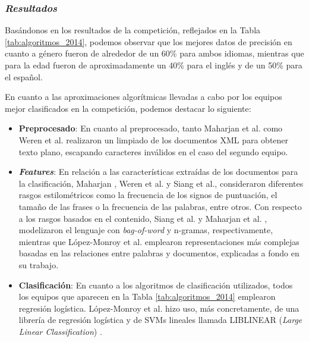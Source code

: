 \subsubsection{\textit{Resultados}}

Basándonos en los resultados de la competición, reflejados en la Tabla \ref{tab:algoritmos_2014}, podemos observar que los mejores datos de precisión
en cuanto a género fueron de alrededor de un 60\% para ambos idiomas, mientras que para la edad fueron de aproximadamente un 40\% para el inglés y de
un 50\% para el español.

\bigskip
En cuanto a las aproximaciones algorítmicas llevadas a cabo por los equipos mejor clasificados en la competición, podemos destacar lo siguiente:

\begin{itemize}
	\item \textbf{Preprocesado}: En cuanto al preprocesado, tanto Maharjan et al. \cite{maharjan2014simple} como Weren et al. \cite{weren2014exploring} realizaron un limpiado de los documentos XML para obtener
	texto plano, escapando caracteres inválidos en el caso del segundo equipo.
	\item \textbf{\textit{Features}}: En relación a las características extraídas de los documentos para la clasificación, Maharjan \cite{maharjan2014simple}, Weren et al. \cite{weren2014exploring} y Siang et al.,
	consideraron diferentes rasgos estilométricos como la frecuencia de los signos de puntuación, el tamaño de las frases o la frecuencia de las palabras, entre otros. Con respecto 
	a los rasgos basados en el contenido, Siang et al. y Maharjan et al. \cite{maharjan2014simple}, modelizaron el lenguaje con \textit{bag-of-word} y n-gramas, respectivamente, mientras
	que López-Monroy et al. \cite{lopez2014using} emplearon representaciones más complejas basadas en las relaciones entre palabras y documentos, explicadas a fondo
	en su trabajo.
	\item \textbf{Clasificación}: En cuanto a los algoritmos de clasificación utilizados, todos los equipos que aparecen en la Tabla \ref{tab:algoritmos_2014} emplearon regresión logística. López-Monroy et al. \cite{lopez2014using}
	hizo uso, más concretamente, de una librería de regresión logística y de SVMs lineales llamada LIBLINEAR (\textit{Large Linear Classification}) \cite{fan2008liblinear}.
\end{itemize}

